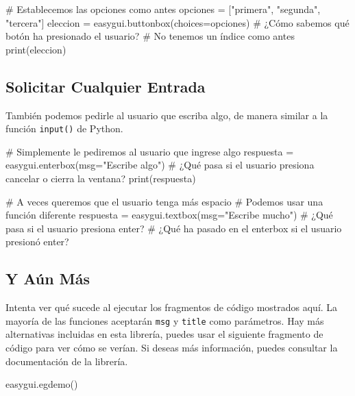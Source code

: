 \documentclass[10pt,a4paper]{article}
\begin{document}
\begin{attachedlisting}[buttons]
# Establecemos las opciones como antes
opciones = ["primera", "segunda", "tercera"]
eleccion = easygui.buttonbox(choices=opciones)
# ¿Cómo sabemos qué botón ha presionado el usuario?
# No tenemos un índice como antes
print(eleccion)
\end{attachedlisting}

\subsection{Solicitar Cualquier Entrada}
También podemos pedirle al usuario que escriba algo, de manera similar a la función \lstinline|input()| de Python.

\begin{attachedlisting}[input]
# Simplemente le pediremos al usuario que ingrese algo
respuesta = easygui.enterbox(msg="Escribe algo")
# ¿Qué pasa si el usuario presiona cancelar o cierra la ventana?
print(respuesta)

# A veces queremos que el usuario tenga más espacio
# Podemos usar una función diferente
respuesta = easygui.textbox(msg="Escribe mucho")
# ¿Qué pasa si el usuario presiona enter?
# ¿Qué ha pasado en el enterbox si el usuario presionó enter?
\end{attachedlisting}

\subsection{Y Aún Más}
Intenta ver qué sucede al ejecutar los fragmentos de código mostrados aquí. La mayoría de las funciones aceptarán \lstinline|msg| y \lstinline|title| como parámetros. Hay más alternativas incluidas en esta librería, puedes usar el siguiente fragmento de código para ver cómo se verían. Si deseas más información, puedes consultar la documentación de la librería.

\begin{attachedlisting}[demo]
easygui.egdemo()
\end{attachedlisting}

\newpage
\end{document}
